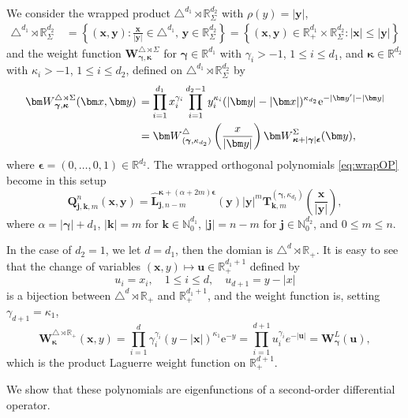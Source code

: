 \documentclass{amsart}
\theoremstyle{remark}
\def\e{\mathrm{e}}
\def\a{{\alpha}}
\def\g{{\gamma}}
\def\k{{\kappa}}
\def\ub{{\bm u}}
\def\xb{{\bm x}}
\def\yb{{\bm y}}
\def\Lb{{\bm L}}
\def\Wb{{\bm W}}
\def\NN{{\mathbb N}}
\def\RR{{\mathbb R}}
\def\bep{{\boldsymbol{\epsilon}}}
\def\bg{{\boldsymbol{\gamma}}}
\def\bk{{\boldsymbol{\kappa}}}
\begin{document}
We consider the wrapped product $\triangle^{d_1}  \rtimes \RR_\Sigma^{d_2}$ with $\rho(y) = |\yb|$, 
\begin{align*}
\triangle^{d_1}  \rtimes \RR_\Sigma^{d_2} \, & = \left\{(\xb,\yb): \frac{\xb}{|\yb|} \in \triangle^{d_1}, \, \yb \in \RR_\Sigma^{d_2}\right\} 
        = \left\{(\xb,\yb) \in \RR_+^{d_1} \times \RR_\Sigma^{d_2}:  |\xb| \le |\yb|\right\}
\end{align*}
and the weight function $\Wb_{\bg, \bk}^{\triangle \rtimes \Sigma}$ for $\bg \in \RR^{d_1}$ with $\g_i > -1$, $1 \le i \le d_1$, and 
$\bk \in \RR^{d_2}$ with $\k_i > -1$, $1\le i \le d_2$, defined on $\triangle^{d_1}  \rtimes \RR_\Sigma^{d_2}$ by  
\begin{align} \label{eq:W-SigT}
\Wb_{\bg, \bk}^{\triangle \rtimes \Sigma}(\xb,\yb) \, & = \prod_{i=1}^{d_1} x_i^{\g_i}  \prod_{i=1}^{d_2-1} y_i^{\k_i}
     (|\bm y|- |\bm x | )^{\k_{d_2}} \e^{-|\yb'| -|\yb|}\\
  & = \Wb_{(\bg, \k_{d_2})}^{\triangle} \left( \frac{x}{|\bm y|} \right) \Wb_{\bk + |\bg| \bep}^\Sigma(\yb), \notag
\end{align}
where $\bep = (0,\ldots,0,1) \in \RR^{d_2}$. The wrapped orthogonal polynomials \eqref{eq:wrapOP} become in this setup
 \begin{equation} \label{eq:OP_SigT}
 \bm Q_{\bm j, \bm k, m}^n(\bm x,\bm y) = \hat \Lb_{\bm j, n-m}^{\bk+(\alpha+2m)\bep}(\bm y) |\bm y|^m 
      \bm T_{\bm k, m}^{(\bg, \k_{d_2}) } \left(\frac{\bm x}{|\bm y|}\right),
\end{equation}
where $\alpha = |\bg|+ d_1$, $|\bm k| = m$ for $\bm k \in \NN_0^{d_1}$, $|\bm j| = n-m$ for $\bm j \in \NN_0^{d_2}$, 
and $0 \le m  \le n$. 

In the case of $d_2 =1$, we let $d = d_1$, then the domian is $\triangle^{d}  \rtimes \RR_+$. It is easy to see that the 
change of variables $(\xb, y) \mapsto \ub \in \RR_+^{d_1 +1}$ defined by 
$$
       u_i = x_i, \quad 1 \le i \le d, \quad u_{d+1} = y-|x|
$$
is a bijection between $\triangle^{d}  \rtimes \RR_+$ and $\RR_+^{d_1+1}$, and the weight function is, setting $\g_{d+1} = \k_1$,  
$$
   \Wb_{\bk}^{\triangle \rtimes \RR_+}(\xb,y) = \prod_{i=1}^{d} \g_i^{\g_i}  (y - |\bm x | )^{\k_{1}} \e^{-y}
       = \prod_{i=1}^{d+1} u_i^{\g_i} e^{- |\ub|} = \Wb_\bg^L(\ub), 
$$
which is the product Laguerre weight function on $\RR_+^{d+1}$.  

We show that these polynomials are eigenfunctions of a second-order differential operator. 

\end{document}
